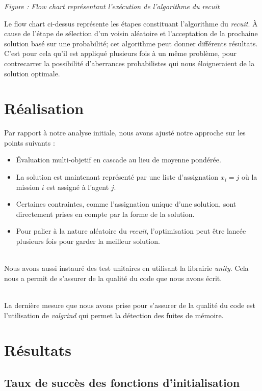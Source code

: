 \documentclass[11pt]{article}
\newcommand{\myjump}[1][0]{\mbox{}\\[#1cm]}
\newcounter{nbFigures}
\newcommand{\myfigure}[2]{
\begin{center}
    \fbox{
    \texttt{[image: \#1]}}\newline
    \emph{Figure \arabic{nbFigures} : #2}
    \stepcounter{nbFigures}
\end{center}
}
\begin{document}
\myfigure{Images/Flowchart_recuit.pdf}{Flow chart représentant l'exécution de l'algorithme du recuit}

Le flow chart ci-dessus représente les étapes constituant l'algorithme du \emph{recuit}. À cause de l'étape de sélection d'un voisin aléatoire et l'acceptation de la prochaine solution basé sur une probabilité; cet algorithme peut donner différents résultats. C'est pour cela qu'il est appliqué plusieurs fois à un même problème, pour contrecarrer la possibilité d'aberrances probabilistes qui nous éloigneraient de la solution optimale.






\newpage
\section{Réalisation}

\noindent Par rapport à notre analyse initiale, nous avons ajusté notre approche sur les points suivants :
\begin{itemize}
    \item Évaluation multi-objetif en cascade au lieu de moyenne pondérée.
    \item La solution est maintenant représenté par une liste d'assignation $x_i = j$ où la mission $i$ est assigné à l'agent $j$.
    \item Certaines contraintes, comme l'assignation unique d'une solution, sont directement prises en compte par la forme de la solution.
    \item Pour palier à la nature aléatoire du \emph{recuit}, l'optimisation peut être lancée plusieurs fois pour garder la meilleur solution.
\end{itemize}


\myjump
Nous avons aussi instauré des test unitaires en utilisant la librairie \emph{unity}. Cela nous a permit de s'assurer de la qualité du code que nous avons écrit.

\myjump
La dernière mesure que nous avons prise pour s'assurer de la qualité du code est l'utilisation de \emph{valgrind} qui permet la détection des fuites de mémoire.



\section{Résultats}


\subsection{Taux de succès des fonctions d'initialisation}
\end{document}
